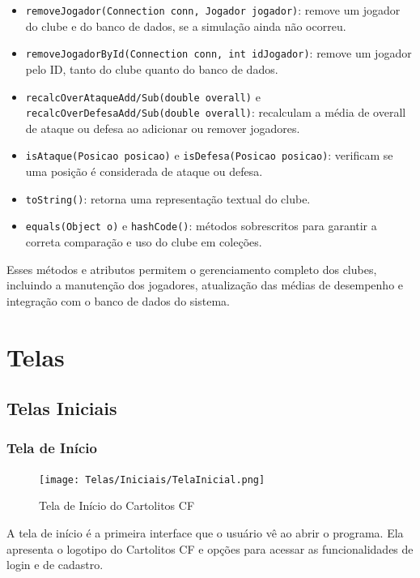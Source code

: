 \documentclass[12pt]{article}
\begin{document}
\begin{itemize}
\begin{itemize}
          \item \texttt{removeJogador(Connection conn, Jogador jogador)}: remove um jogador do clube e do banco de dados, se a simulação ainda não ocorreu.
          \item \texttt{removeJogadorById(Connection conn, int idJogador)}: remove um jogador pelo ID, tanto do clube quanto do banco de dados.
          \item \texttt{recalcOverAtaqueAdd/Sub(double overall)} e \texttt{recalcOverDefesaAdd/Sub(double overall)}: recalculam a média de overall de ataque ou defesa ao adicionar ou remover jogadores.
          \item \texttt{isAtaque(Posicao posicao)} e \texttt{isDefesa(Posicao posicao)}: verificam se uma posição é considerada de ataque ou defesa.
          \item \texttt{toString()}: retorna uma representação textual do clube.
          \item \texttt{equals(Object o)} e \texttt{hashCode()}: métodos sobrescritos para garantir a correta comparação e uso do clube em coleções.
        \end{itemize}
\end{itemize}

Esses métodos e atributos permitem o gerenciamento completo dos clubes, incluindo a manutenção dos jogadores, atualização das médias de desempenho e integração com o banco de dados do sistema.

\section{Telas}
\label{sec:telas}

\subsection{Telas Iniciais}
\label{sec:telas_iniciais}

\subsubsection{Tela de Início}
\label{sec:tela_inicio}

\begin{figure}[H]
  \centering
  \texttt{[image: Telas/Iniciais/TelaInicial.png]}
  \caption{Tela de Início do Cartolitos CF}
  \label{fig:tela_inicio}
\end{figure}
A tela de início é a primeira interface que o usuário vê ao abrir o programa. Ela apresenta o logotipo do Cartolitos CF e opções para acessar as funcionalidades de login e de cadastro.
\end{document}
